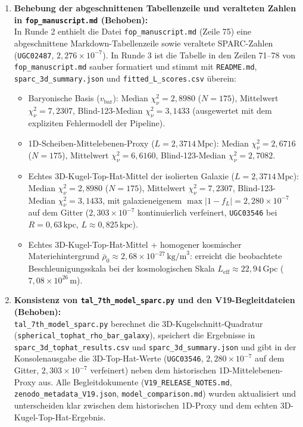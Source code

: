\documentclass[10pt,a4paper]{article}
\begin{document}
{\begin{enumerate}\setlength{\itemsep}{2.5pt}\setlength{\parskip}{1pt}\setlength{\topsep}{2pt}
  \item \textbf{Behebung der abgeschnittenen Tabellenzeile und veralteten Zahlen in \texttt{fop\_manuscript.md} (Behoben):}\\
  In Runde 2 enthielt die Datei \texttt{fop\_manuscript.md} (Zeile 75) eine abgeschnittene Markdown-Tabellenzeile sowie veraltete SPARC-Zahlen (\texttt{UGC02487}, $2{,}276\times 10^{-7}$). In Runde 3 ist die Tabelle in den Zeilen 71--78 von \texttt{fop\_manuscript.md} sauber formatiert und stimmt mit \texttt{README.md}, \texttt{sparc\_3d\_summary.json} und \texttt{fitted\_L\_scores.csv} \"uberein:
  \begin{itemize}\setlength{\itemsep}{1pt}\setlength{\parskip}{0pt}\setlength{\topsep}{1pt}
    \item Baryonische Basis ($v_{\text{bar}}$): Median $\chi^2_\nu = 2{,}8980$ ($N=175$), Mittelwert $\chi^2_\nu = 7{,}2307$, Blind-123-Median $\chi^2_\nu = 3{,}1433$ (ausgewertet mit dem expliziten Fehlermodell der Pipeline).
    \item 1D-Scheiben-Mittelebenen-Proxy ($L = 2{,}3714\,\text{Mpc}$): Median $\chi^2_\nu = 2{,}6716$ ($N=175$), Mittelwert $\chi^2_\nu = 6{,}6160$, Blind-123-Median $\chi^2_\nu = 2{,}7082$.
    \item Echtes 3D-Kugel-Top-Hat-Mittel der isolierten Galaxie ($L = 2{,}3714\,\text{Mpc}$): Median $\chi^2_\nu = 2{,}8980$ ($N=175$), Mittelwert $\chi^2_\nu = 7{,}2307$, Blind-123-Median $\chi^2_\nu = 3{,}1433$, mit galaxieneigenem $\max|1-f_L| = 2{,}280\times 10^{-7}$ auf dem Gitter ($2{,}303\times 10^{-7}$ kontinuierlich verfeinert, \texttt{UGC03546} bei $R = 0{,}63\,\text{kpc}$, $L \approx 0{,}825\,\text{kpc}$).
    \item Echtes 3D-Kugel-Top-Hat-Mittel + homogener kosmischer Materiehintergrund $\bar{\rho}_0 \approx 2{,}68\times 10^{-27}\,\text{kg/m}^3$: erreicht die beobachtete Beschleunigungsskala bei der kosmologischen Skala $L_{\text{eff}} \approx 22{,}94\,\text{Gpc}$ ($7{,}08\times 10^{26}\,\text{m}$).
  \end{itemize}

  \item \textbf{Konsistenz von \texttt{tal\_7th\_model\_sparc.py} und den V19-Begleitdateien (Behoben):}\\
  \texttt{tal\_7th\_model\_sparc.py} berechnet die 3D-Kugelschnitt-Quadratur (\texttt{spherical\_tophat\_rho\_bar\_galaxy}), speichert die Ergebnisse in \texttt{sparc\_3d\_tophat\_results.csv} und \texttt{sparc\_3d\_summary.json} und gibt in der Konsolenausgabe die 3D-Top-Hat-Werte (\texttt{UGC03546}, $2{,}280\times 10^{-7}$ auf dem Gitter, $2{,}303\times 10^{-7}$ verfeinert) neben dem historischen 1D-Mittelebenen-Proxy aus. Alle Begleitdokumente (\texttt{V19\_RELEASE\_NOTES.md}, \texttt{zenodo\_metadata\_V19.json}, \texttt{model\_comparison.md}) wurden aktualisiert und unterscheiden klar zwischen dem historischen 1D-Proxy und dem echten 3D-Kugel-Top-Hat-Ergebnis.


\end{enumerate}}
\end{document}
